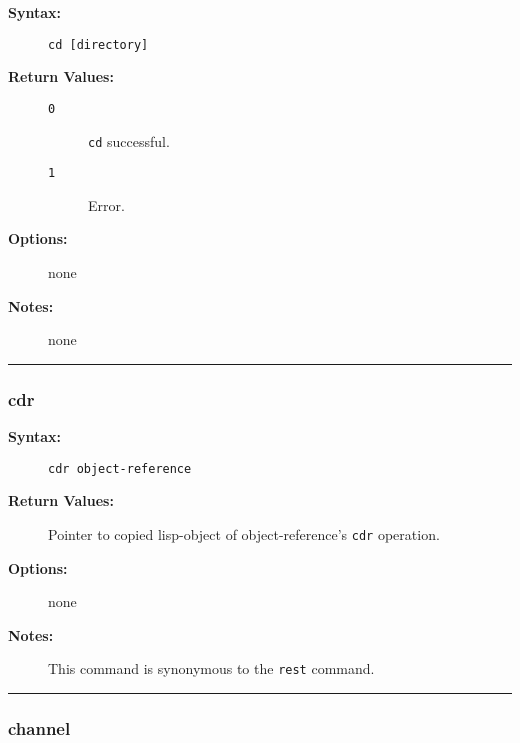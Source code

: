 \begin{description}
\item[{\bf Syntax:}] \mbox{}

{\tt cd [directory]}

\item[{\bf Return Values:}] \mbox{}

\begin{description}
\item[{\tt 0}] \mbox{}

{\tt cd} successful.

\item[{\tt 1}] \mbox{}

Error.

\end{description}


\item[{\bf Options:}] \mbox{}

none  

\item[{\bf Notes:}] \mbox{}

none  

\end{description}


\hrule
\subsubsection{cdr}

\begin{description}
\item[{\bf Syntax:}] \mbox{}

{\tt cdr object-reference}

\item[{\bf Return Values:}] \mbox{}

Pointer to copied lisp-object of 
object-reference's {\tt cdr} operation.

\item[{\bf Options:}] \mbox{}

none  

\item[{\bf Notes:}] \mbox{}

This command is synonymous to the {\tt rest}
command.

\end{description}


\hrule
\subsubsection{channel}

